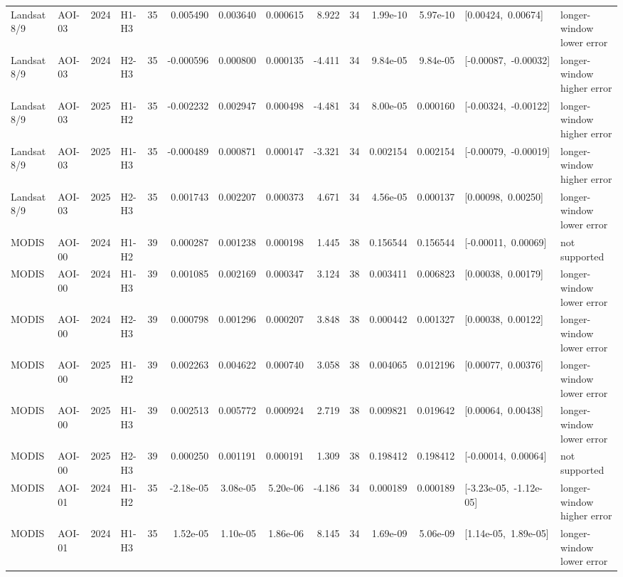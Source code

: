 \begin{landscape}
\begin{longtable}{llclrrrrrrrrp{2.35cm}p{1.75cm}}
Landsat 8/9 & AOI-03 & 2024 & H1-H3 & 35 & 0.005490 & 0.003640 & 0.000615 & 8.922 & 34 & 1.99e-10 & 5.97e-10 & \mbox{[0.00424, 0.00674]} & longer-window lower error \\
Landsat 8/9 & AOI-03 & 2024 & H2-H3 & 35 & -0.000596 & 0.000800 & 0.000135 & -4.411 & 34 & 9.84e-05 & 9.84e-05 & \mbox{[-0.00087, -0.00032]} & longer-window higher error \\
Landsat 8/9 & AOI-03 & 2025 & H1-H2 & 35 & -0.002232 & 0.002947 & 0.000498 & -4.481 & 34 & 8.00e-05 & 0.000160 & \mbox{[-0.00324, -0.00122]} & longer-window higher error \\
Landsat 8/9 & AOI-03 & 2025 & H1-H3 & 35 & -0.000489 & 0.000871 & 0.000147 & -3.321 & 34 & 0.002154 & 0.002154 & \mbox{[-0.00079, -0.00019]} & longer-window higher error \\
Landsat 8/9 & AOI-03 & 2025 & H2-H3 & 35 & 0.001743 & 0.002207 & 0.000373 & 4.671 & 34 & 4.56e-05 & 0.000137 & \mbox{[0.00098, 0.00250]} & longer-window lower error \\
MODIS & AOI-00 & 2024 & H1-H2 & 39 & 0.000287 & 0.001238 & 0.000198 & 1.445 & 38 & 0.156544 & 0.156544 & \mbox{[-0.00011, 0.00069]} & not supported \\
MODIS & AOI-00 & 2024 & H1-H3 & 39 & 0.001085 & 0.002169 & 0.000347 & 3.124 & 38 & 0.003411 & 0.006823 & \mbox{[0.00038, 0.00179]} & longer-window lower error \\
MODIS & AOI-00 & 2024 & H2-H3 & 39 & 0.000798 & 0.001296 & 0.000207 & 3.848 & 38 & 0.000442 & 0.001327 & \mbox{[0.00038, 0.00122]} & longer-window lower error \\
MODIS & AOI-00 & 2025 & H1-H2 & 39 & 0.002263 & 0.004622 & 0.000740 & 3.058 & 38 & 0.004065 & 0.012196 & \mbox{[0.00077, 0.00376]} & longer-window lower error \\
MODIS & AOI-00 & 2025 & H1-H3 & 39 & 0.002513 & 0.005772 & 0.000924 & 2.719 & 38 & 0.009821 & 0.019642 & \mbox{[0.00064, 0.00438]} & longer-window lower error \\
MODIS & AOI-00 & 2025 & H2-H3 & 39 & 0.000250 & 0.001191 & 0.000191 & 1.309 & 38 & 0.198412 & 0.198412 & \mbox{[-0.00014, 0.00064]} & not supported \\
MODIS & AOI-01 & 2024 & H1-H2 & 35 & -2.18e-05 & 3.08e-05 & 5.20e-06 & -4.186 & 34 & 0.000189 & 0.000189 & \mbox{[-3.23e-05, -1.12e-05]} & longer-window higher error \\
MODIS & AOI-01 & 2024 & H1-H3 & 35 & 1.52e-05 & 1.10e-05 & 1.86e-06 & 8.145 & 34 & 1.69e-09 & 5.06e-09 & \mbox{[1.14e-05, 1.89e-05]} & longer-window lower error \\

\end{longtable}
\end{landscape}
